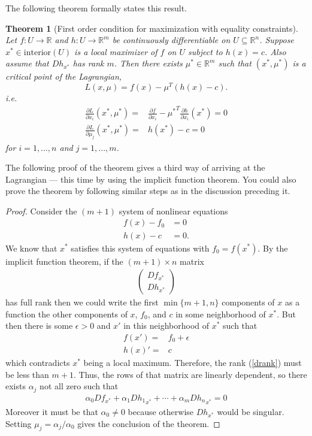 \documentclass[12pt,reqno]{amsart}
\newtheorem{theorem}{Theorem}[section]
\theoremstyle{definition}
\def\R{\mathbb{R}}
\renewcommand{\to}{{\rightarrow}}
\begin{document}
The following theorem formally states this result.
\begin{theorem}[First order condition for maximization with equality constraints] \label{thm:econ}
  Let $f:U \to \R$ and $h: U \to \R^m$ be continuously
  differentiable on $U \subseteq \R^n$. Suppose $x^* \in
  \mathrm{interior}(U)$ is a local maximizer of $f$ on $U$ subject to 
  $h(x) = c$. Also assume that $Dh_{x^*}$ has rank $m$. Then there
  exists $\mu^* \in \R^m$ such that $(x^*, \mu^*)$ is a critical point
  of the Lagrangian,
  \[ L(x,\mu) = f(x) - \mu^T (h(x) - c). \]
  i.e.
  \begin{align*}
    \frac{\partial L}{\partial x_i}(x^*,\mu^*) = & \frac{\partial
      f}{\partial x_i} - {\mu^*}^T \frac{\partial h}{\partial
      x_i}(x^*) = 0 \\
    \frac{\partial L}{\partial \mu_j}(x^*,\mu^*) = & h(x^*) -
    c = 0
  \end{align*}
  for $i = 1, ..., n$ and $j=1,...,m$.
\end{theorem}
The following proof of the theorem gives a third way of arriving at
the Lagrangian --- this time by using the implicit function
theorem. You could also prove the theorem by following similar steps
as in the discussion preceding it.
\begin{proof} 
  Consider the $(m+1)$ system of nonlinear equations
  \begin{align*}
  f(x) - f_0 & = 0 \\
  h(x) - c &=0.
  \end{align*}
  We know that $x^*$ satisfies this system of equations with $f_0 = f(x^*)$.
  By the implicit function theorem, if the $(m+1) \times n$ 
  matrix 
  \begin{align}
    \begin{pmatrix} Df_{x^*} \\ Dh_{x^*} \end{pmatrix} \label{drank}
  \end{align}
  has full rank then we could write the first $\min\{m+1,n\}$
  components of $x$ as a function the other components of $x$, $f_0$,
  and $c$ in some neighborhood of $x^*$. But then there is some
  $\epsilon > 0$ and $x'$ in this neighborhood of $x^*$ such that 
  \begin{align*}
    f(x') = & f_0 + \epsilon  \\
    h(x)' = & c
  \end{align*}
  which contradicts $x^*$ being a local maximum. Therefore, the rank
  (\ref{drank}) must be less than $m+1$. Thus, the rows of that matrix
  are linearly dependent, so there exists $\alpha_j$ not all zero such that 
  \begin{align*}
    \alpha_0 Df_{x^*} + \alpha_1 D{h_1}_{x^*}  + \cdots + \alpha_m
    D{h_n}_{x^*} = 0      
  \end{align*}
  Moreover it must be that $\alpha_0 \neq 0$ because otherwise
  $Dh_{x^*}$ would be singular. Setting $\mu_j = \alpha_j/\alpha_0$
  gives the conclusion of the theorem.
\end{proof}
\end{document}
